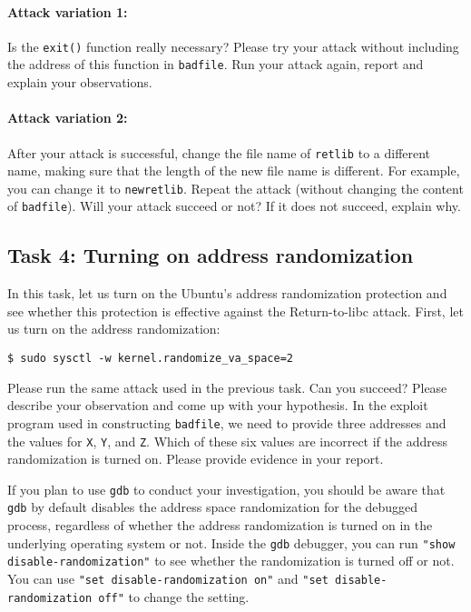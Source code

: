 \paragraph{Attack variation 1:}
Is the \texttt{exit()} function really necessary? Please try 
your attack without including the address of this function in
\texttt{badfile}. Run your attack again, report and explain your
observations.  



\paragraph{Attack variation 2:} 
After your attack is successful, change the file name of \texttt{retlib}
to a different name, making sure that the length of the new 
file name is different. For example, you can change it to \texttt{newretlib}. 
Repeat the attack (without changing the content of {\tt badfile}). 
Will your attack succeed or not?  If it does not succeed, explain why.



\subsection{Task 4: Turning on address randomization}

In this task, let us turn on the Ubuntu's address randomization protection  
and see whether this protection is effective against 
the Return-to-libc attack. First, let us 
turn on the address randomization:  

\begin{lstlisting}
$ sudo sysctl -w kernel.randomize_va_space=2
\end{lstlisting}


Please run the same attack used in the previous task. Can you succeed? 
Please describe your observation and come up with your hypothesis. 
In the exploit program used in constructing \texttt{badfile}, we
need to provide three addresses and the values for \texttt{X}, \texttt{Y},
and \texttt{Z}. Which of these six values are incorrect if 
the address randomization is turned on. Please provide evidence in your
report. 


If you plan to use \texttt{gdb} to conduct your investigation, you should
be aware that \texttt{gdb} by default disables the address space randomization for the
debugged process, regardless of whether the address randomization is 
turned on in the underlying operating system or not. Inside the
\texttt{gdb} debugger, you can run \texttt{"show disable-randomization"} 
to see whether the randomization is turned off or not.
You can use \texttt{"set disable-randomization on"} and
\texttt{"set disable-randomization off"} to change the setting. 



